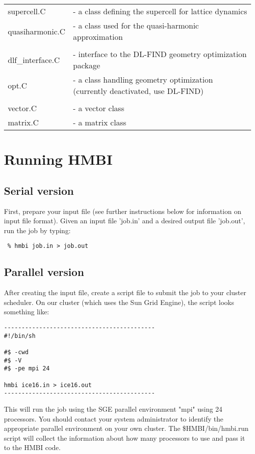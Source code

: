 \documentclass[11pt,letterpaper]{article}
\begin{document}
\begin{spacing}{1.0}
\begin{tabular}{ll}
supercell.C      &- a class defining the supercell for lattice dynamics\\
quasiharmonic.C  &- a class used for the quasi-harmonic approximation\\

\\
dlf\_interface.C &- interface to the DL-FIND geometry optimization package \\
opt.C		&- a class handling geometry optimization (currently deactivated, use DL-FIND)\\
\\
vector.C	&- a vector class \\
matrix.C        &- a matrix class \\
\end{tabular}

\section{Running HMBI}

\subsection{Serial version}

First, prepare your input file (see further instructions below for information
on input file format).  Given an input file 'job.in' and a desired output file
'job.out', run the job by typing:
\begin{verbatim}
 % hmbi job.in > job.out
\end{verbatim}

\subsection{Parallel version}

After creating the input file, create a script file to submit the job
to your cluster scheduler.  On our cluster (which uses the Sun Grid
Engine), the script looks something like:
\begin{verbatim}
-------------------------------------------
#!/bin/sh

#$ -cwd
#$ -V
#$ -pe mpi 24

hmbi ice16.in > ice16.out
-------------------------------------------
\end{verbatim}

This will run the job using the SGE parallel environment "mpi" using
24 processors.  You should contact your system administrator to identify
the appropriate parallel environment on your own cluster.
The \$HMBI/bin/hmbi.run script will collect the information about how many
processors to use and pass it to the HMBI code. 



\end{spacing}
\end{document}
